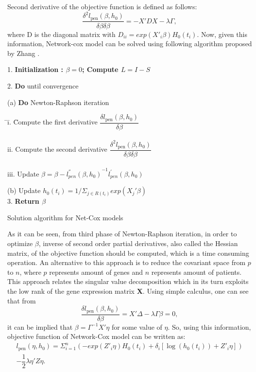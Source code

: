 \documentclass{ba-kecs}
\numberwithin{figure}{section}
\numberwithin{equation}{section}
\begin{document}
Second derivative of the objective function is defined as follows:
\begin{equation}
\dfrac{\delta^2{l_\mathrm{pen}(\beta , h_{0})}}{\delta{\beta}\delta{\beta}} = -X'DX - \lambda{\Gamma} ,
\end{equation}
where D is the diagonal matrix with $D_{ii} = exp(X'_{i}\beta)H_{0}(t_{i})$. Now, given this information, Network-cox model can be solved using following algorithm proposed by Zhang \cite{netcox}.


\begin{algorithm}


1. \textbf{Initialization : $\beta = 0$; Compute $L = I - S$}

2. \textbf{Do} until convergence

(a) \textbf{Do} Newton-Raphson iteration

\begin{tabbing}
\= 	\quad \= i. \= Compute the first derivative $\dfrac{\delta{l_\mathrm{pen}(\beta , h_{0})}}{\delta{\beta}}$ \\ \\
\> 		\> ii. \> Compute the second derivative $\dfrac{\delta^2{l_\mathrm{pen}(\beta , h_{0})}}{\delta{\beta}\delta{\beta}} $\\ \\
\> 		\> iii. \> Update $\beta = \beta - {l^{''}_{pen}(\beta,h_{0})}^{-1}l^{'}_{pen}(\beta,h_0)$
\end{tabbing}

(b) Update $h_{0}(t_{i}) = 1/\Sigma_{j \in R(t_{i})} exp(X_{j}'\beta)$
\\
3. \textbf{Return $\beta$}

\caption{Solution algorithm for Net-Cox models}
\end{algorithm}


As it can be seen, from third phase of Newton-Raphson iteration, in order to optimize $\beta$, inverse of second order partial derivatives, also called the Hessian matrix, of the objective function should be computed, which is a time consuming operation. An alternative to this approach is to reduce the covariant space from $p$ to $n$, where $p$ represents amount of genes and $n$ represents amount of patients. This approach relates the singular value decomposition which in its turn exploits the low rank of the gene expression matrix \textbf{X}. Using simple calculus, one can see that from
\begin{equation}
\dfrac{\delta{l_\mathrm{pen}(\beta , h_{0})}}{\delta{\beta}} = X'\Delta - \lambda{\Gamma}\beta = 0,
\end{equation}
it can be implied that $\beta = \Gamma^{-1} X' \eta$ for some value of $\eta$. So, using this information, objective function of Network-Cox model can be written as:
\begin{multline}
l_\mathrm{pen}(\eta , h_{0}) = \Sigma^{n}_{i=1}(-exp(Z'_{i}\eta)H_{0}(t_{i})+\delta_{i}[\log(h_{0}(t_{i}))+Z'_{i}\eta]) \\
 - \dfrac{1}{2}\lambda{\eta'}Z\eta.
\end{multline}
\end{document}
